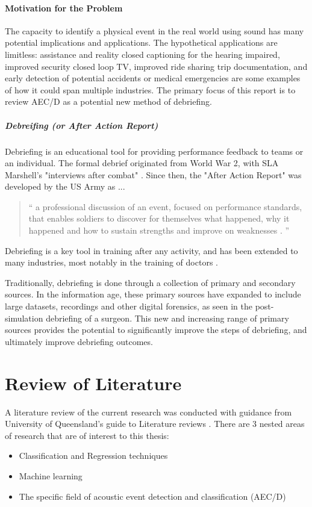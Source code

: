 \documentclass{UoNMCHA}
\newcommand{\inlineQuote}[1]{`` #1 ''}
\newcommand{\fancyquote}[1]{\begin{quotation}\inlineQuote{#1}\end{quotation}}
\numberwithin{equation}{section}
\begin{document}
\paragraph{Motivation for the Problem}
The capacity to identify a physical event in the real world using sound has many potential implications and applications. The hypothetical applications are limitless: assistance and reality closed captioning for the hearing impaired, improved security closed loop TV, improved ride sharing trip documentation, and early detection of potential accidents or medical emergencies are some examples of how it could span multiple industries. The primary focus of this report is to review AEC/D as a potential new method of debriefing.

\subparagraph{Debreifing (or After Action Report)}
Debriefing is an educational tool for providing performance feedback to teams or an individual.
The formal debrief originated from World War 2, with SLA Marshell's "interviews after combat" \cite{DebriefAAR}. Since then, the "After Action Report" was developed by the US Army as ...
\fancyquote{a professional discussion of an event, focused on performance standards, that enables soldiers to discover for themselves what happened, why it happened and how to sustain strengths and improve on weaknesses \cite{TC2520}.}
Debriefing is a key tool in training after any activity, and has been extended to many industries, most notably in the training of doctors \cite{johnson2011debriefing}.

Traditionally, debriefing is done through a collection of primary and secondary sources\cite{recentAAR}. In the information age, these primary sources have expanded to include large datasets, recordings and other digital forensics, as seen in the post-simulation debriefing of a surgeon. This new and increasing range of primary sources provides the potential to significantly improve the steps of debriefing, and ultimately improve debriefing outcomes. %


\clearpage \section{Review of Literature}\label{sec:LitReview}
A literature review of the current research was conducted with guidance from University of Queensland’s guide to Literature reviews \cite{QueenslandReview}. There are 3 nested areas of research that are of interest to this thesis:
\begin{itemize}
    \item Classification and Regression techniques
    \item Machine learning
    \item The specific field of acoustic event detection and classification (AEC/D)
\end{itemize}
\end{document}
